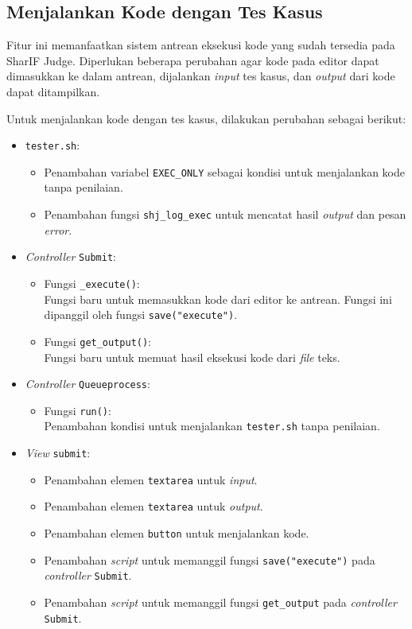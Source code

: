 \subsection{Menjalankan Kode dengan Tes Kasus}
\label{subsec:4:jalan}

Fitur ini memanfaatkan sistem antrean eksekusi kode yang sudah tersedia pada SharIF Judge.
Diperlukan beberapa perubahan agar kode pada editor dapat dimasukkan ke dalam antrean, dijalankan \textit{input} tes kasus, dan \textit{output} dari kode dapat ditampilkan.

Untuk menjalankan kode dengan tes kasus, dilakukan perubahan sebagai berikut:
\begin{itemize}
	\item \verb|tester.sh|:
    \begin{itemize}
        \item Penambahan variabel \verb|EXEC_ONLY| sebagai kondisi untuk menjalankan kode tanpa penilaian.
        \item Penambahan fungsi \verb|shj_log_exec| untuk mencatat hasil \textit{output} dan pesan \textit{error}.
    \end{itemize}
	\item \textit{Controller} \verb|Submit|:
    \begin{itemize}
        \item Fungsi \verb|_execute()|: \\ Fungsi baru untuk memasukkan kode dari editor ke antrean. Fungsi ini dipanggil oleh fungsi \verb|save("execute")|.
        \item Fungsi \verb|get_output()|: \\ Fungsi baru untuk memuat hasil eksekusi kode dari \textit{file} teks.
    \end{itemize}
	\item \textit{Controller} \verb|Queueprocess|:
    \begin{itemize}
        \item Fungsi \verb|run()|: \\ Penambahan kondisi untuk menjalankan \verb|tester.sh| tanpa penilaian.
    \end{itemize}
    \item \textit{View} \verb|submit|:
    \begin{itemize}
		\item Penambahan elemen \verb|textarea| untuk \textit{input}.
		\item Penambahan elemen \verb|textarea| untuk \textit{output}.
        \item Penambahan elemen \verb|button| untuk menjalankan kode.
        \item Penambahan \textit{script} untuk memanggil fungsi \verb|save("execute")| pada \textit{controller} \verb|Submit|.
        \item Penambahan \textit{script} untuk memanggil fungsi \verb|get_output| pada \textit{controller} \verb|Submit|.
    \end{itemize}
\end{itemize}

